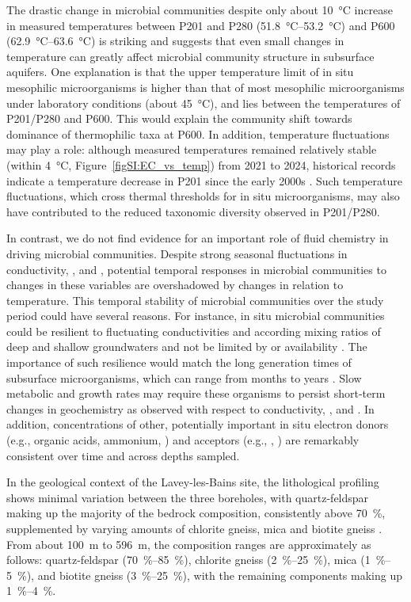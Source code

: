 The drastic change in microbial communities despite only about \SI{10}{\celsius} increase in measured temperatures between P201 and P280 (\SIrange{51.8}{53.2}{\celsius}) and P600 (\SIrange{62.9}{63.6}{\celsius}) is striking and suggests that even small changes in temperature can greatly affect microbial community structure in subsurface aquifers.
One explanation is that the upper temperature limit of in situ mesophilic microorganisms is higher than that of most mesophilic microorganisms under laboratory conditions (about \SI{45}{\celsius}), and lies between the temperatures of P201/P280 and P600.
This would explain the community shift towards dominance of thermophilic taxa at P600.
In addition, temperature fluctuations may play a role: although measured temperatures remained relatively stable (within \SI{4}{\celsius}, Figure~\ref{figSI:EC_vs_temp}) from 2021 to 2024, historical records indicate a temperature decrease in P201 since the early 2000s \citep{sonney2009numerical}.
Such temperature fluctuations, which cross thermal thresholds for in situ microorganisms, may also have contributed to the reduced taxonomic diversity observed in P201/P280.

In contrast, we do not find evidence for an important role of fluid chemistry in driving microbial communities.
Despite strong seasonal fluctuations in conductivity, , and , potential temporal responses in microbial communities to changes in these variables are overshadowed by changes in relation to temperature.
This temporal stability of microbial communities over the study period could have several reasons.
For instance, in situ microbial communities could be resilient to fluctuating conductivities and according mixing ratios of deep and shallow groundwaters and not be limited by  or  availability \citep{lever2015life, hoehler2013microbial}.
The importance of such resilience would match the long generation times of subsurface microorganisms, which can range from months to years \citep{joergensen2011deep}.
Slow metabolic and growth rates may require these organisms to persist short-term changes in geochemistry as observed with respect to conductivity, , and .
In addition, concentrations of other, potentially important in situ electron donors (e.g., organic acids, ammonium, ) and acceptors (e.g., , ) are remarkably consistent over time and across depths sampled.

In the geological context of the Lavey-les-Bains site, the lithological profiling shows minimal variation between the three boreholes, with quartz-feldspar making up the majority of the bedrock composition, consistently above \SI{70}{\percent}, supplemented by varying amounts of chlorite gneiss, mica and biotite gneiss \citep{swisstopo2024lavey1}.
From about \SI{100}{\meter} to \SI{596}{\meter}, the composition ranges are approximately as follows: quartz-feldspar (\SIrange{70}{85}{\percent}), chlorite gneiss (\SIrange{2}{25}{\percent}), mica (\SIrange{1}{5}{\percent}), and biotite gneiss (\SIrange{3}{25}{\percent}), with the remaining components making up \SIrange{1}{4}{\percent}.

